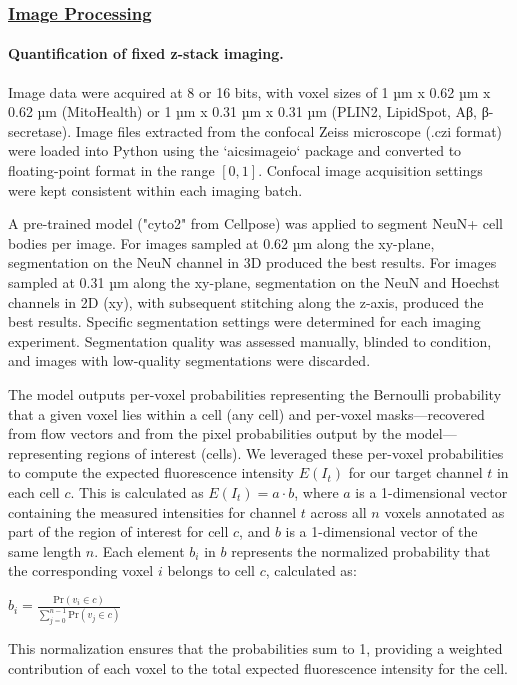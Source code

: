 \subsubsection{\underline{Image Processing}}

\paragraph{Quantification of fixed z-stack imaging.}
Image data were acquired at 8 or 16 bits, with voxel sizes of 1 µm x 0.62 µm x 0.62 µm (MitoHealth) or 1 µm x 0.31 µm x 0.31 µm (PLIN2, LipidSpot, Aβ, β-secretase). Image files extracted from the confocal Zeiss microscope (.czi format) were loaded into Python using the `aicsimageio` package and converted to floating-point format in the range $[0,1]$. Confocal image acquisition settings were kept consistent within each imaging batch.

A pre-trained model ("cyto2" from Cellpose\cite{Stringer2021-ek}) was applied to segment NeuN+ cell bodies per image. For images sampled at 0.62 µm along the xy-plane, segmentation on the NeuN channel in 3D produced the best results. For images sampled at 0.31 µm along the xy-plane, segmentation on the NeuN and Hoechst channels in 2D (xy), with subsequent stitching along the z-axis, produced the best results. Specific segmentation settings were determined for each imaging experiment. Segmentation quality was assessed manually, blinded to condition, and images with low-quality segmentations were discarded.

The model outputs per-voxel probabilities representing the Bernoulli probability that a given voxel lies within a cell (any cell) and per-voxel masks—recovered from flow vectors and from the pixel probabilities output by the model—representing regions of interest (cells). We leveraged these per-voxel probabilities to compute the expected fluorescence intensity $E(I_t)$ for our target channel $t$ in each cell $c$. This is calculated as $E(I_t) = a \cdot b$, where $a$ is a 1-dimensional vector containing the measured intensities for channel $t$ across all $n$ voxels annotated as part of the region of interest for cell $c$, and $b$ is a 1-dimensional vector of the same length $n$. Each element $b_i$ in $b$ represents the normalized probability that the corresponding voxel $i$ belongs to cell $c$, calculated as:

$b_i = \frac{\text{Pr}(v_i \in c)}{\sum_{j=0}^{n-1} \text{Pr}(v_j \in c)}$

This normalization ensures that the probabilities sum to 1, providing a weighted contribution of each voxel to the total expected fluorescence intensity for the cell.

